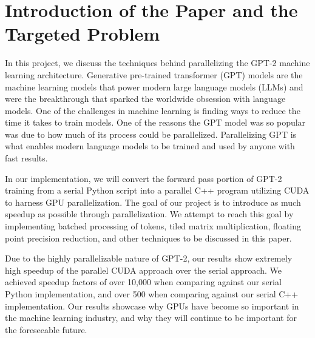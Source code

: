 \section{Introduction of the Paper and the Targeted Problem}

In this project, we discuss the techniques behind parallelizing the GPT-2 machine learning architecture. Generative 
pre-trained transformer (GPT) models are the machine learning models that power modern large language models (LLMs) and were the 
breakthrough that sparked the worldwide obsession with language models. One of the challenges in machine learning is 
finding ways to reduce the time it takes to train models. One of the reasons the GPT model was so popular was due to how 
much of its process could be parallelized. Parallelizing GPT is what enables modern language models to be trained and used 
by anyone with fast results.

In our implementation, we will convert the forward pass portion of GPT-2 training from a serial Python script into a 
parallel C++ program utilizing CUDA to harness GPU parallelization. The goal of our project is to introduce as much speedup 
as possible through parallelization. We attempt to reach this goal by implementing batched processing of tokens, tiled 
matrix multiplication, floating point precision reduction, and other techniques to be discussed in this paper.

Due to the highly parallelizable nature of GPT-2, our results show extremely high speedup of the parallel CUDA approach over 
the serial approach. We achieved speedup factors of over 10,000 when comparing against our serial Python implementation, 
and over 500 when comparing against our serial C++ implementation. Our results showcase why GPUs have become so important in 
the machine learning industry, and why they will continue to be important for the foreseeable future.